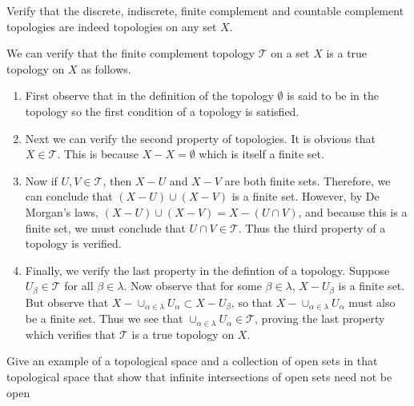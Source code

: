 \documentclass[letterpaper,12pt,twoside]{maths}
\begin{document}
\begin{exercise}[3.5]
    Verify that the discrete, indiscrete, finite
    complement and countable complement topologies are indeed topologies
    on any set $X$. 
\end{exercise} 

\begin{solution}
    We can verify that the finite complement topology $\mathscr{T}$ on a
set $X$ is a true topology on $X$ as follows. 
\begin{enumerate}
    \item First observe that in
    the definition of the topology $\emptyset$ is said to be in the
    topology so the first condition of a topology is satisfied. 

    \item Next we can verify the second property of topologies. It is obvious
    that $X \in \mathscr{T}$. This is because $X - X = \emptyset$ which is
    itself a finite set. 
    
    \item Now if $U, V \in \mathscr{T}$, then $X - U$ and $X - V$ are both
    finite sets. Therefore, we can conclude that $(X - U) \cup (X - V)$ is
    a finite set. However, by De Morgan's laws, $(X - U) \cup (X - V) = X
    - (U \cap V)$, and because this is a finite set, we must conclude that
    $U \cap V \in \mathscr{T}$. Thus the third property of a topology is
    verified. 

    \item Finally, we verify the last property in the defintion of a topology.
    Suppose $U_\beta \in
    \mathscr{T}$ for all $\beta \in \lambda.$ Now observe that for some $\beta \in
    \lambda$, $X - U_\beta$ is a finite set. But observe that $X -
    \cup_{\alpha \in \lambda}U_\alpha \subset X - U_\beta$, so that $X -
    \cup_{\alpha \in \lambda}U_\alpha$ must also be a finite set. Thus we
    see that $\cup_{\alpha \in \lambda}U_\alpha \in \mathscr{T}$, proving
    the last property which verifies that $\mathscr{T}$ is a true topology
    on $X$. 
\end{enumerate}

\end{solution}

\begin{exercise}[Exercise 3.7]
    Give an example of a topological space and a
    collection of open sets in that topological space that show that
    infinite intersections of open sets need not be open 
\end{exercise}
\end{document}
